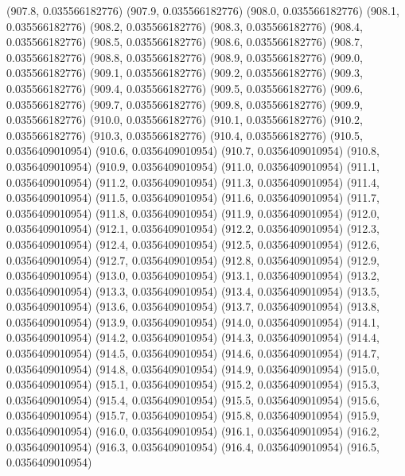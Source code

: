 {					(907.8, 0.035566182776)
					(907.9, 0.035566182776)
					(908.0, 0.035566182776)
					(908.1, 0.035566182776)
					(908.2, 0.035566182776)
					(908.3, 0.035566182776)
					(908.4, 0.035566182776)
					(908.5, 0.035566182776)
					(908.6, 0.035566182776)
					(908.7, 0.035566182776)
					(908.8, 0.035566182776)
					(908.9, 0.035566182776)
					(909.0, 0.035566182776)
					(909.1, 0.035566182776)
					(909.2, 0.035566182776)
					(909.3, 0.035566182776)
					(909.4, 0.035566182776)
					(909.5, 0.035566182776)
					(909.6, 0.035566182776)
					(909.7, 0.035566182776)
					(909.8, 0.035566182776)
					(909.9, 0.035566182776)
					(910.0, 0.035566182776)
					(910.1, 0.035566182776)
					(910.2, 0.035566182776)
					(910.3, 0.035566182776)
					(910.4, 0.035566182776)
					(910.5, 0.0356409010954)
					(910.6, 0.0356409010954)
					(910.7, 0.0356409010954)
					(910.8, 0.0356409010954)
					(910.9, 0.0356409010954)
					(911.0, 0.0356409010954)
					(911.1, 0.0356409010954)
					(911.2, 0.0356409010954)
					(911.3, 0.0356409010954)
					(911.4, 0.0356409010954)
					(911.5, 0.0356409010954)
					(911.6, 0.0356409010954)
					(911.7, 0.0356409010954)
					(911.8, 0.0356409010954)
					(911.9, 0.0356409010954)
					(912.0, 0.0356409010954)
					(912.1, 0.0356409010954)
					(912.2, 0.0356409010954)
					(912.3, 0.0356409010954)
					(912.4, 0.0356409010954)
					(912.5, 0.0356409010954)
					(912.6, 0.0356409010954)
					(912.7, 0.0356409010954)
					(912.8, 0.0356409010954)
					(912.9, 0.0356409010954)
					(913.0, 0.0356409010954)
					(913.1, 0.0356409010954)
					(913.2, 0.0356409010954)
					(913.3, 0.0356409010954)
					(913.4, 0.0356409010954)
					(913.5, 0.0356409010954)
					(913.6, 0.0356409010954)
					(913.7, 0.0356409010954)
					(913.8, 0.0356409010954)
					(913.9, 0.0356409010954)
					(914.0, 0.0356409010954)
					(914.1, 0.0356409010954)
					(914.2, 0.0356409010954)
					(914.3, 0.0356409010954)
					(914.4, 0.0356409010954)
					(914.5, 0.0356409010954)
					(914.6, 0.0356409010954)
					(914.7, 0.0356409010954)
					(914.8, 0.0356409010954)
					(914.9, 0.0356409010954)
					(915.0, 0.0356409010954)
					(915.1, 0.0356409010954)
					(915.2, 0.0356409010954)
					(915.3, 0.0356409010954)
					(915.4, 0.0356409010954)
					(915.5, 0.0356409010954)
					(915.6, 0.0356409010954)
					(915.7, 0.0356409010954)
					(915.8, 0.0356409010954)
					(915.9, 0.0356409010954)
					(916.0, 0.0356409010954)
					(916.1, 0.0356409010954)
					(916.2, 0.0356409010954)
					(916.3, 0.0356409010954)
					(916.4, 0.0356409010954)
					(916.5, 0.0356409010954)
}

